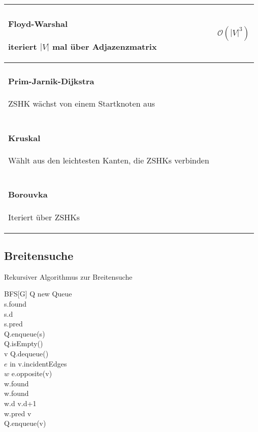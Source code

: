 \begin{center}
\begin{tabular}{|p{.4\linewidth}|p{.5\linewidth}|}
\paragraph{Floyd-Warshal}
iteriert $|V|$ mal über Adjazenzmatrix
&
$$\mathcal{O}(|V|^3)$$
\\\hline\hline
\paragraph{Prim-Jarnik-Dijkstra}
ZSHK wächst von einem Startknoten aus
&
\\\hline
\paragraph{Kruskal}
Wählt aus den leichtesten Kanten, die ZSHKs verbinden
&
\\\hline
\paragraph{Borouvka}
Iteriert über ZSHKs
&
\\\hline
\end{tabular}
\end{center}

\subsection{Breitensuche}
\label{subsec:Breitensuche}

Rekursiver Algorithmus zur Breitensuche

\begin{algorithm}{BFS}[G]{
	\qinput{}
	\qoutput{}
}
Q \qlet new Queue\\ %
s.found \qlet \qtrue\\
s.d \\
s.pred \qlet \qnil\\ %
Q.enqueue(s)\\
\qwhile \qnot Q.isEmpty()\\
	v \qlet Q.dequeue()\\
	\qfor $e$ in v.incidentEdges\\
		$w$ \qlet e.opposite(v)\\
		\qif \qnot w.found\\
			\qthen
				w.found \qlet \qtrue\\
				w.d \qlet v.d+1\\
				w.pred \qlet v\\%
				Q.enqueue(v)%
		\qfi
	\qrof
\qelihw
\end{algorithm}

